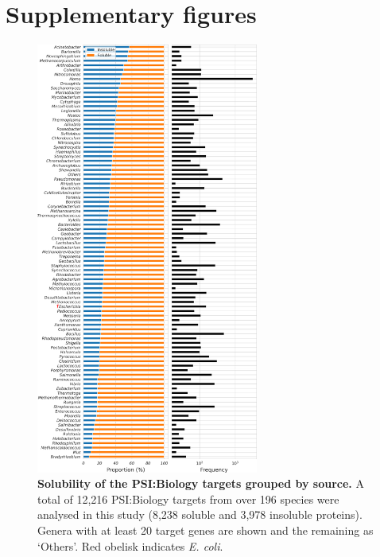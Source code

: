 \section{Supplementary figures}
\begin{figure}[htbp!]
\center
\includegraphics[width=0.65\textwidth]{appendix/Solubility/Figs/S1.png}
\caption[Solubility of the PSI:Biology targets grouped by source. ]{\textbf{Solubility of the PSI:Biology targets grouped by source. } A total of 12,216 PSI:Biology targets from over 196 species were analysed in this study (8,238 soluble and 3,978 insoluble proteins). Genera with at least 20 target genes are shown and the remaining as ‘Others’. Red obelisk indicates \textit{E. coli}.
}%
\label{fig:appendix_solubility_S1}
\end{figure}

